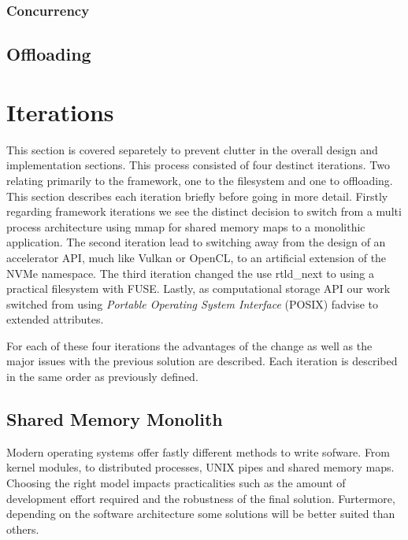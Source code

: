 \subsubsection{Concurrency}

\subsection{Offloading}


\section{Iterations}

This section is covered separetely to prevent clutter in the overall design and
implementation sections. This process consisted of four destinct iterations.
Two relating primarily to the framework, one to the filesystem and one to
offloading. This section describes each iteration briefly before going in more
detail. Firstly regarding framework iterations we see the distinct decision
to switch from a multi process architecture using mmap for shared memory maps to
a monolithic application. The second iteration lead to switching away from the
design of an accelerator API, much like Vulkan \cite{vulkan} or OpenCL, to an
artificial extension of the NVMe namespace. The third iteration changed the use
rtld\_next \cite{rtldnext} to using a practical filesystem with FUSE. Lastly, as
computational storage API our work switched from using
\textit{Portable Operating System Interface} (POSIX) fadvise \cite{fadvise} to
extended attributes.

For each of these four iterations the advantages of the change as well as the
major issues with the previous solution are described. Each iteration is
described in the same order as previously defined.

\subsection{Shared Memory Monolith}

Modern operating systems offer fastly different methods to write sofware. From
kernel modules, to distributed processes, UNIX pipes and shared memory maps.
Choosing the right model impacts practicalities such as the amount of
development effort required and the robustness of the final solution. 
Furtermore, depending on the software architecture some solutions will be better
suited than others.

